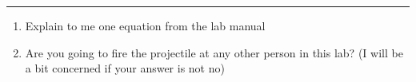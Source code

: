 \documentclass[11pt]{article}
\begin{document}
\Large

\medskip\hrule\bigskip\bigskip
{}
\begin{enumerate}

\item Explain to me one equation from the lab manual
  \vspace*{0.43\textheight}
\item Are you going to fire the projectile at any other person in this lab? (I will be a bit concerned if your answer is not no)
  
\end{enumerate}
\end{document}
